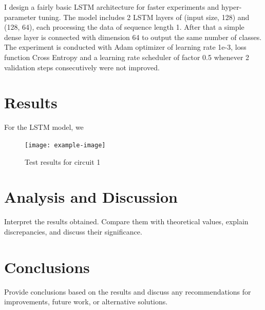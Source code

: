 \documentclass[a4paper,12pt]{article}
\begin{document}
I design a fairly basic LSTM architecture for faster experiments and hyper-parameter tuning. The model includes 2 LSTM layers of (input size, 128) and (128, 64), each processing the data of sequence length 1. After that a simple dense layer is connected with dimension 64 to output the same number of classes. The experiment is conducted with Adam optimizer of learning rate 1e-3, loss function Cross Entropy and a learning rate scheduler of factor 0.5 whenever 2 validation steps consecutively were not improved.


\section{Results}
For the LSTM model, we 

\begin{figure}[h!]
    \centering
    \texttt{[image: example-image]} %
    \caption{Test results for circuit 1}
    \label{fig:circuit1}
\end{figure}

\section{Analysis and Discussion}
Interpret the results obtained. Compare them with theoretical values, explain discrepancies, and discuss their significance.

\section{Conclusions}
Provide conclusions based on the results and discuss any recommendations for improvements, future work, or alternative solutions.

\newpage

\end{document}
